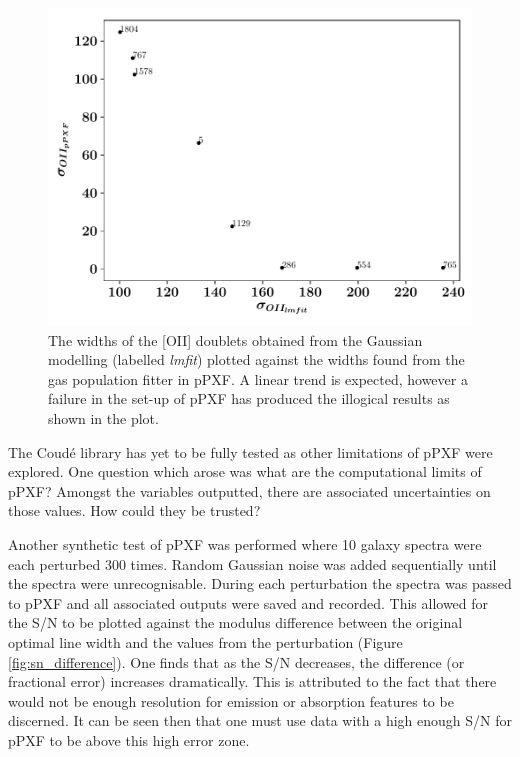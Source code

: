 \documentclass[12pt, twocolumn]{revtex4-1}    %
\begin{document}
\begin{figure}
\includegraphics[width=1.0\linewidth]{data/oii_ppxf_vs_oii_lmfit}
\caption{The widths of the [OII] doublets obtained from the Gaussian modelling (labelled \textit{lmfit}) plotted against the widths found from the gas population fitter in pPXF. A linear trend is expected, however a failure in the set-up of pPXF has produced the illogical results as shown in the plot.}
\label{fig:oii_widths}
\end{figure}

The Coud{\'e} library has yet to be fully tested as other limitations of pPXF were explored. One question which arose was what are the computational limits of pPXF? Amongst the variables outputted, there are associated uncertainties on those values. How could they be trusted? 

Another synthetic test of pPXF was performed where 10 galaxy spectra were each perturbed 300 times. Random Gaussian noise was added sequentially until the spectra were unrecognisable. During each perturbation the spectra was passed to pPXF and all associated outputs were saved and recorded. This allowed for the S/N to be plotted against the modulus difference between the original optimal line width and the values from the perturbation (Figure \ref{fig:sn_difference}). One finds that as the S/N decreases, the difference (or fractional error) increases dramatically. This is attributed to the fact that there would not be enough resolution for emission or absorption features to be discerned. It can be seen then that one must use data with a high enough S/N for pPXF to be above this high error zone.
\end{document}
